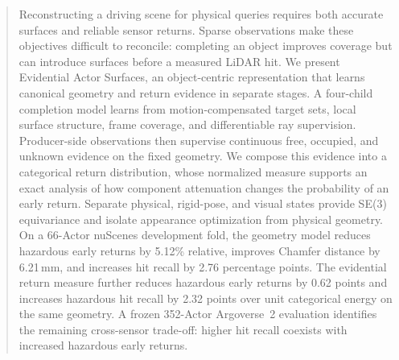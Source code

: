 \begin{abstract}
Reconstructing a driving scene for physical queries requires both accurate surfaces and reliable sensor returns.
Sparse observations make these objectives difficult to reconcile: completing an object improves coverage but can
introduce surfaces before a measured LiDAR hit. We present Evidential Actor Surfaces, an object-centric representation
that learns canonical geometry and return evidence in separate stages. A four-child completion model learns from
motion-compensated target sets, local surface structure, frame coverage, and differentiable ray supervision.
Producer-side observations then supervise continuous free, occupied, and unknown evidence on the fixed geometry.
We compose this evidence into a categorical return distribution, whose normalized measure supports an exact analysis
of how component attenuation changes the probability of an early return. Separate physical, rigid-pose, and visual
states provide SE(3) equivariance and isolate appearance optimization from physical geometry.
On a 66-Actor nuScenes development fold, the geometry model reduces hazardous early returns by 5.12\% relative,
improves Chamfer distance by 6.21\,mm, and increases hit recall by 2.76 percentage points.
The evidential return measure further reduces hazardous early returns by 0.62 points and increases hazardous hit
recall by 2.32 points over unit categorical energy on the same geometry.
A frozen 352-Actor Argoverse~2 evaluation identifies the remaining cross-sensor trade-off: higher hit recall
coexists with increased hazardous early returns.
\end{abstract}
